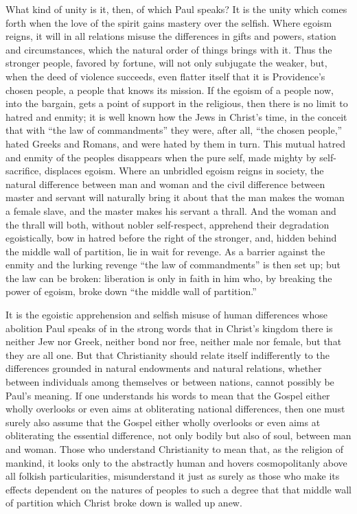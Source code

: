 \documentclass[12pt]{book}
\newcommand{\opage}[1]{\marginnote{\footnotesize\textit{[#1]}}}
\begin{document}
What kind of unity is it, then, of which Paul speaks? It is the unity
which comes forth when the love of the spirit gains mastery over the
selfish. Where egoism reigns, it will in all relations misuse the
differences in gifts and powers, station and circumstances, which the
natural order of things brings with it. Thus the stronger people,
favored by fortune, will not only subjugate the weaker, but, when the
deed of violence succeeds, even flatter itself that it is Providence's
chosen people, a people that knows its mission. If the egoism of a
people now, into the bargain, gets a point of support in the religious,
then there is no limit to hatred and enmity; it is well known how the
Jews in Christ's time, in the conceit that with ``the law of
commandments'' they were, after all, ``the chosen people,'' hated Greeks
and Romans, and were hated by them in turn. This mutual hatred and
enmity of the peoples disappears when the pure self, made mighty by
self-sacrifice, displaces egoism. Where an unbridled egoism reigns in
society, the natural difference between man and woman and the civil
difference between master and servant will naturally bring it about that
the man makes the woman a female slave, and the master makes his servant
a thrall. And the woman and the thrall will both, without nobler
self-respect, apprehend their degradation egoistically, bow in hatred
before the right of the stronger, and, hidden behind the middle wall of
partition, lie in wait for revenge. As a barrier against the enmity and
the lurking revenge ``the law of commandments'' is then set up; but the
law can be broken: liberation is only in faith in him who,
\opage{137}\setcounter{footnote}{0}%
by breaking the power of egoism, broke down ``the middle wall of
partition.''

It is the egoistic apprehension and selfish misuse of human
differences whose abolition Paul speaks of in the strong words that in
Christ's kingdom there is neither Jew nor Greek, neither bond nor free,
neither male nor female, but that they are all one. But that
Christianity should relate itself indifferently to the differences
grounded in natural endowments and natural relations, whether between
individuals among themselves or between nations, cannot possibly be
Paul's meaning. If one understands his words to mean that the Gospel
either wholly overlooks or even aims at obliterating national
differences, then one must surely also assume that the Gospel either
wholly overlooks or even aims at obliterating the essential difference,
not only bodily but also of soul, between man and woman. Those who
understand Christianity to mean that, as the religion of mankind, it
looks only to the abstractly human and hovers cosmopolitanly above all
folkish particularities, misunderstand it just as surely as those who
make its effects dependent on the natures of peoples to such a degree
that that middle wall of partition which Christ broke down is walled up
anew.
\end{document}
